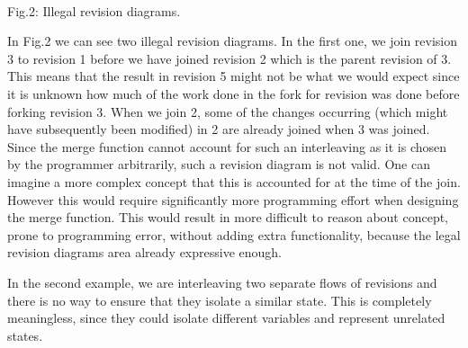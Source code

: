 \documentclass[12pt,twoside,notitlepage]{report}
\begin{document}
\\Fig.2: Illegal revision diagrams.
\vspace{10pt}

In Fig.2 we can see two illegal revision diagrams. In the first one, we join revision 3 to revision 1 before we have joined revision 2 which is the parent revision of 3. This means that the result in revision 5 might not be what we would expect since it is unknown how much of the work done in the fork for revision was done before forking revision 3. When we join 2, some of the changes occurring (which might have subsequently been modified) in 2 are already joined when 3 was joined. Since the merge function cannot account for such an interleaving as it is chosen by the programmer arbitrarily, such a revision diagram is not valid. One can imagine a more complex concept that this is accounted for at the time of the join. However this would require significantly more programming effort when designing the merge function. This would result in more difficult to reason about concept, prone to programming error, without adding extra functionality, because the legal revision diagrams area already expressive enough. 

In the second example, we are interleaving two separate flows of revisions and there is no way to ensure that they isolate a similar state. This is completely meaningless, since they could isolate different variables and represent unrelated states.
\end{document}
